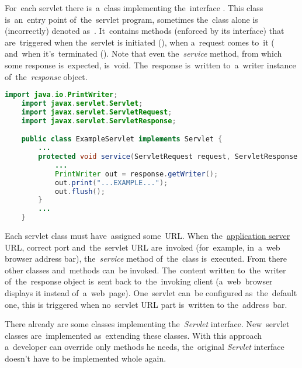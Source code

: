 For~each servlet there is~a~class implementing the~interface .
This class is~an~entry point of~the~servlet program, sometimes the~class alone is (incorrectly) denoted as~.
It~contains methods (enforced by its interface) that are~triggered when the~servlet is initiated (), when a~request comes to~it ( and~when it's~terminated ().
Note that even the~\textit{service} method, from which some response is~expected, is~void.
The~response is~written to~a~writer instance of~the~\textit{response} object.

\enlargethispage{10mm}
\example
\begin{lstlisting}[language=Java]
    import java.io.PrintWriter;
    import javax.servlet.Servlet;
    import javax.servlet.ServletRequest;
    import javax.servlet.ServletResponse;

    public class ExampleServlet implements Servlet {
        ...
        protected void service(ServletRequest request, ServletResponse response) {
            ...
            PrintWriter out = response.getWriter();
            out.print("...EXAMPLE...");
            out.flush();
        }
        ...
    }
\end{lstlisting}

Each servlet class must have~assigned some~URL\@.
When the~\hyperref[applicationserver]{application server} URL, correct port and~the~servlet URL are~invoked (for~example, in~a~web browser address bar), the~\textit{service} method of~the~class is~executed.
From there other classes and~methods can~be invoked.
The~content written to~the~writer of~the~response object is~sent back to~the~invoking client (a~web~browser displays it instead of~a~web~page).
One~servlet can~be configured as~the~default one, this is triggered when no~servlet URL part is~written to the~address~bar.

There already are some classes implementing the~\textit{Servlet} interface.
New~servlet classes are~implemented as~extending these classes.
With this approach a~developer can override only methods he needs, the~original \textit{Servlet} interface doesn't have to be implemented whole again.

